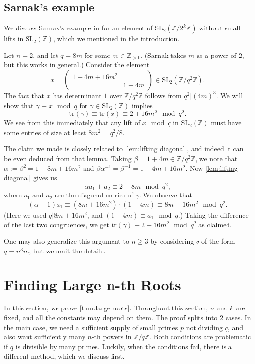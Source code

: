 \documentclass[12pt, a4paper]{amsart}
\numberwithin{equation}{section}
\theoremstyle{definition}
\newcommand{\Z}{\mathbb{Z}}
\newcommand{\SL}{\mathrm{SL}}
\newcommand{\tr}{\mathrm{tr}}
\begin{document}
\subsection{Sarnak's example}\label{sec:sarnak expample}
We discuss Sarnak's example in \cite{sarnak2015lettermiller} for an element of $\SL_2(\Z/2^k\Z)$ without
small lifts in $\SL_2(\Z)$, which we mentioned in the introduction.


Let $n=2$, and let $q=8m$ for some $m\in\Z_{>0}$.
(Sarnak takes $m$ as a power of $2$, but this works in general.) 
Consider the element
\[
x=\left(\begin{array}{cc}
	1-4m+16m^2\\
	& 1+4m
\end{array}\right)\in\SL_2(\Z/q^2\Z).
\]
The fact that $x$ has determinant $1$ over $\Z/q^2\Z$ follows
from $q^2|(4m)^3$.
We will show that $\gamma\equiv x\mod q$ for $\gamma\in\SL_2(\Z)$
implies
\[
\tr(\gamma)\equiv \tr(x)\equiv 2+16 m^2\mod q^2.
\]
We see from this immediately that any lift of $x\mod q$ in $\SL_2(\Z)$ must
have some entries of size at least $8m^2= q^2/8$.



The claim we made is closely related to \cref{lem:lifting diagonal}, and indeed it
can be even deduced from that lemma.
Taking $\beta=1+4m\in\Z/q^2\Z$, we note that $\alpha:=\beta^2=1+8m+16m^2$ and
$\beta \alpha^{-1}=\beta^{-1}=1- 4m +16m^2$.
Now \cref{lem:lifting diagonal} gives us
\[
\alpha a_1+a_2\equiv 2+ 8m \mod q^2,
\]
where $a_1$ and $a_2$ are the diagonal entries of $\gamma$.
We observe that
\[
(\alpha-1)a_1\equiv (8m+16m^2)\cdot (1- 4m) \equiv 8m -16 m^2 \mod q^2.
\]
(Here we used $q|8m+16m^2$, and $(1-4m)\equiv a_1\mod q$.)
Taking the difference of the last two
congruences, we get $\tr(\gamma)\equiv2+16m^2\mod q^2$ as claimed.


One may also generalize this argument to $n\ge3$ by considering $q$ of the form $q=n^{3}m$, but we omit the details.

\section{Finding Large n-th Roots}\label{sec:large roots}

In this section, we prove \cref{thm:large roots}. Throughout this section, $n$ and $k$ are fixed, and all the constants may depend on them.
The proof splits into 2 cases. 
In the main case, we need a sufficient supply of small primes $p$ not dividing $q$, and also want sufficiently many $n$-th powers in $\Z/q\Z$. 
Both conditions are problematic if $q$ is divisible by many primes. Luckily, when the conditions fail, there is a different method, which we discuss first. 
\end{document}
